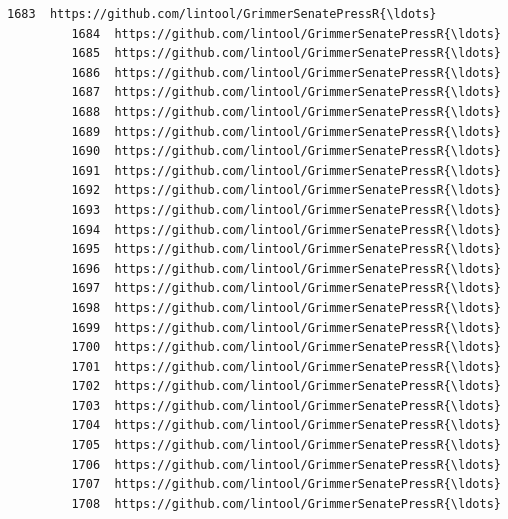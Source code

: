 \documentclass[11pt]{article}
\begin{document}
\begin{Verbatim}[commandchars=\\\{\}]
         1683  https://github.com/lintool/GrimmerSenatePressR{\ldots}   
         1684  https://github.com/lintool/GrimmerSenatePressR{\ldots}   
         1685  https://github.com/lintool/GrimmerSenatePressR{\ldots}   
         1686  https://github.com/lintool/GrimmerSenatePressR{\ldots}   
         1687  https://github.com/lintool/GrimmerSenatePressR{\ldots}   
         1688  https://github.com/lintool/GrimmerSenatePressR{\ldots}   
         1689  https://github.com/lintool/GrimmerSenatePressR{\ldots}   
         1690  https://github.com/lintool/GrimmerSenatePressR{\ldots}   
         1691  https://github.com/lintool/GrimmerSenatePressR{\ldots}   
         1692  https://github.com/lintool/GrimmerSenatePressR{\ldots}   
         1693  https://github.com/lintool/GrimmerSenatePressR{\ldots}   
         1694  https://github.com/lintool/GrimmerSenatePressR{\ldots}   
         1695  https://github.com/lintool/GrimmerSenatePressR{\ldots}   
         1696  https://github.com/lintool/GrimmerSenatePressR{\ldots}   
         1697  https://github.com/lintool/GrimmerSenatePressR{\ldots}   
         1698  https://github.com/lintool/GrimmerSenatePressR{\ldots}   
         1699  https://github.com/lintool/GrimmerSenatePressR{\ldots}   
         1700  https://github.com/lintool/GrimmerSenatePressR{\ldots}   
         1701  https://github.com/lintool/GrimmerSenatePressR{\ldots}   
         1702  https://github.com/lintool/GrimmerSenatePressR{\ldots}   
         1703  https://github.com/lintool/GrimmerSenatePressR{\ldots}   
         1704  https://github.com/lintool/GrimmerSenatePressR{\ldots}   
         1705  https://github.com/lintool/GrimmerSenatePressR{\ldots}   
         1706  https://github.com/lintool/GrimmerSenatePressR{\ldots}   
         1707  https://github.com/lintool/GrimmerSenatePressR{\ldots}   
         1708  https://github.com/lintool/GrimmerSenatePressR{\ldots}   
         

\end{Verbatim}
\end{document}
